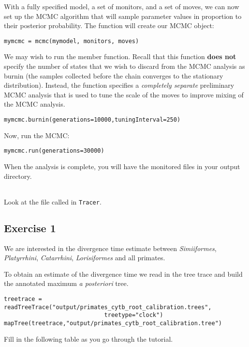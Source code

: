 With a fully specified model, a set of monitors, and a set of moves, we can now set up the MCMC algorithm that will sample parameter values in proportion to their posterior probability. The  function will create our MCMC object:
{\tt \begin{snugshade*}
\begin{lstlisting}
mymcmc = mcmc(mymodel, monitors, moves)
\end{lstlisting}
\end{snugshade*}}


We may wish to run the  member function.
Recall that this function \textbf{does not} specify the number of states that we wish to discard from the MCMC analysis as burnin (\IE the samples collected before the chain converges to the stationary distribution).  
Instead, the  function specifies a \textit{completely separate} preliminary MCMC analysis that is used to tune the scale of the moves to improve mixing of the MCMC analysis.
{\tt \begin{snugshade*}
\begin{lstlisting}
mymcmc.burnin(generations=10000,tuningInterval=250)
\end{lstlisting}
\end{snugshade*}}


Now, run the MCMC:
{\tt \begin{snugshade*}
\begin{lstlisting}
mymcmc.run(generations=30000)
\end{lstlisting}
\end{snugshade*}}

When the analysis is complete, you will have the monitored files in your output directory.

\noindent \\ \impmark Look at the file called  in \texttt{Tracer}.


\subsection{Exercise 1}

We are interested in the divergence time estimate between \emph{Simiiformes}, \emph{Platyrrhini}, \emph{Catarrhini}, \emph{Lorisiformes} and all primates.

To obtain an estimate of the divergence time we read in the tree trace and build the annotated maximum \textit{a posteriori} tree.
{\tt \begin{snugshade*}
\begin{lstlisting}
treetrace = readTreeTrace("output/primates_cytb_root_calibration.trees",
                             treetype="clock")
mapTree(treetrace,"output/primates_cytb_root_calibration.tree")
\end{lstlisting}
\end{snugshade*}}
Fill in the following table as you go through the tutorial.

